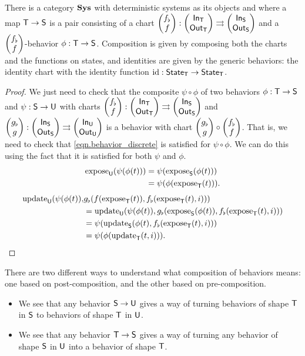\documentclass[DynamicalBook]{subfiles}
\begin{document}
\begin{proposition}
  There is a category $\textbf{Sys}$ with deterministic systems as its objects and
  where a map $\mathsf{T} \to \mathsf{S}$ is a pair consisting of a chart
  $\begin{pmatrix}{f_{\flat}} \\ {f} \end{pmatrix} : \begin{pmatrix}{\mathsf{In}_{\mathsf{T}}} \\ {\mathsf{Out}_{\mathsf{T}}} \end{pmatrix} \rightrightarrows
  \begin{pmatrix}{\mathsf{In}_{\mathsf{S}}} \\ {\mathsf{Out}_{\mathsf{S}}} \end{pmatrix}$ and a $\begin{pmatrix}{f_{\flat}} \\ {f} \end{pmatrix}$-behavior $\phi : \mathsf{T}
  \to \mathsf{S}$. Composition is given by composing both the charts and the
  functions on states, and identities are given by the generic behaviors: the identity chart with the
  identity function $\mathrm{id} : \mathsf{State}_{\mathsf{T}} \to \mathsf{State}_{\mathsf{T}}$.
\end{proposition}
\begin{proof}
  We just need to check that the composite $\psi \circ \phi$ of two behaviors $\phi : \mathsf{T} \to
  \mathsf{S}$ and $\psi : \mathsf{S} \to \mathsf{U}$ with charts $\begin{pmatrix}{f_{\flat}} \\ {f} \end{pmatrix} : \begin{pmatrix}{\mathsf{In}_{\mathsf{T}}} \\ {\mathsf{Out}_{\mathsf{T}}} \end{pmatrix} \rightrightarrows
  \begin{pmatrix}{\mathsf{In}_{\mathsf{S}}} \\ {\mathsf{Out}_{\mathsf{S}}} \end{pmatrix}$ and $\begin{pmatrix}{g_{\flat}} \\ {g} \end{pmatrix} : \begin{pmatrix}{\mathsf{In}_{\mathsf{S}}} \\ {\mathsf{Out}_{\mathsf{S}}} \end{pmatrix} \rightrightarrows
  \begin{pmatrix}{\mathsf{In}_{\mathsf{U}}} \\ {\mathsf{Out}_{\mathsf{U}}} \end{pmatrix}$ is a behavior with chart $\begin{pmatrix}{g_{\flat}} \\ {g} \end{pmatrix} \circ
  \begin{pmatrix}{f_{\flat}} \\ {f} \end{pmatrix}$. That is, we need to check that
  \cref{eqn.behavior_discrete} is satisfied for $\psi \circ \phi$. We can do
  this using the fact that it is satisfied for both $\psi$ and $\phi$.
  \begin{align*}
    \mathrm{expose}_{\mathsf{U}}(\psi(\phi(t))) &= \psi(\mathrm{expose}_{\mathsf{S}}(\phi(t))) \\
                              &= \psi(\phi(\mathrm{expose}_{\mathsf{T}}(t))).\\
  \end{align*}
  \begin{align*}
    \mathrm{update}_{\mathsf{U}}(\psi(\phi(t)), &g_{\flat}(f(\mathrm{expose}_{\mathsf{T}}(t)), f_{\flat}(\mathrm{expose}_{\mathsf{T}}(t), i)))  \\
                              &=\mathrm{update}_{\mathsf{U}}(\psi(\phi(t)), g_{\flat}(\mathrm{expose}_{\mathsf{S}}(\phi(t)), f_{\flat}(\mathrm{expose}_{\mathsf{T}}(t), i))) \\
                              &= \psi(\mathrm{update}_{\mathsf{S}}(\phi(t), f_{\flat}(\mathrm{expose}_{\mathsf{T}}(t), i))) \\
    &= \psi(\phi(\mathrm{update}_{\mathsf{T}}(t, i))).
  \end{align*}
\end{proof}

There are two different ways to understand what composition of behaviors means:
one based on post-composition, and the other based on pre-composition.
\begin{itemize}
  \item We see that any behavior $\mathsf{S} \to \mathsf{U}$ gives a way of turning
    behaviors of shape $\mathsf{T}$ in $\mathsf{S}$ to behaviors of shape $\mathsf{T}$ in $\mathsf{U}$.
  \item We see that any behavior $\mathsf{T} \to \mathsf{S}$ gives a way of turning
    any behavior of shape $\mathsf{S}$ in $\mathsf{U}$ into a behavior of shape $\mathsf{T}$.
\end{itemize}
\end{document}
